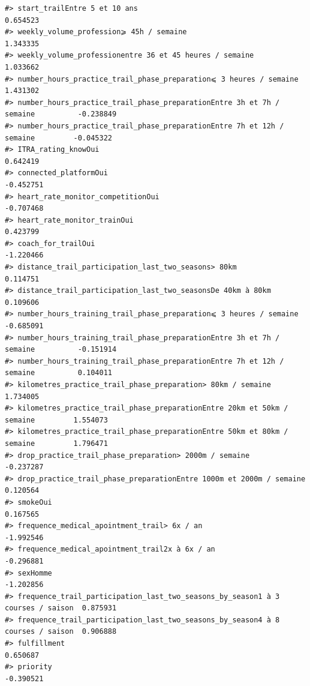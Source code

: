 \documentclass[
]{article}
\begin{document}
\begin{verbatim}
#> start_trailEntre 5 et 10 ans                                                    0.654523
#> weekly_volume_profession⩾ 45h / semaine                                         1.343335
#> weekly_volume_professionentre 36 et 45 heures / semaine                         1.033662
#> number_hours_practice_trail_phase_preparation⩽ 3 heures / semaine               1.431302
#> number_hours_practice_trail_phase_preparationEntre 3h et 7h / semaine          -0.238849
#> number_hours_practice_trail_phase_preparationEntre 7h et 12h / semaine         -0.045322
#> ITRA_rating_knowOui                                                             0.642419
#> connected_platformOui                                                          -0.452751
#> heart_rate_monitor_competitionOui                                              -0.707468
#> heart_rate_monitor_trainOui                                                     0.423799
#> coach_for_trailOui                                                             -1.220466
#> distance_trail_participation_last_two_seasons> 80km                             0.114751
#> distance_trail_participation_last_two_seasonsDe 40km à 80km                     0.109606
#> number_hours_training_trail_phase_preparation⩽ 3 heures / semaine              -0.685091
#> number_hours_training_trail_phase_preparationEntre 3h et 7h / semaine          -0.151914
#> number_hours_training_trail_phase_preparationEntre 7h et 12h / semaine          0.104011
#> kilometres_practice_trail_phase_preparation> 80km / semaine                     1.734005
#> kilometres_practice_trail_phase_preparationEntre 20km et 50km / semaine         1.554073
#> kilometres_practice_trail_phase_preparationEntre 50km et 80km / semaine         1.796471
#> drop_practice_trail_phase_preparation> 2000m / semaine                         -0.237287
#> drop_practice_trail_phase_preparationEntre 1000m et 2000m / semaine             0.120564
#> smokeOui                                                                        0.167565
#> frequence_medical_apointment_trail> 6x / an                                    -1.992546
#> frequence_medical_apointment_trail2x à 6x / an                                 -0.296881
#> sexHomme                                                                       -1.202856
#> frequence_trail_participation_last_two_seasons_by_season1 à 3 courses / saison  0.875931
#> frequence_trail_participation_last_two_seasons_by_season4 à 8 courses / saison  0.906888
#> fulfillment                                                                     0.650687
#> priority                                                                       -0.390521

\end{verbatim}
\end{document}
